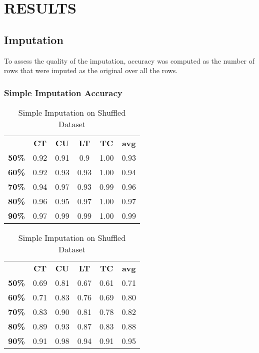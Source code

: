\documentclass{article}
\begin{document}
\section{RESULTS}

\subsection{Imputation}
To assess the quality of the imputation, accuracy was computed as the number of rows that were imputed as the original over all the rows.

\subsubsection{Simple Imputation Accuracy}

\begin{table}[h]
\begin{minipage}{.45\textwidth}\centering
\begin{tabular}{cccccc}
			  & \textbf{CT} & \textbf{CU} & \textbf{LT} & \textbf{TC} & \textbf{avg} \\
\textbf{50\%} & 0.92        & 0.91        & 0.9         & 1.00        & 0.93 \\
\textbf{60\%} & 0.92        & 0.93        & 0.93        & 1.00        & 0.94 \\
\textbf{70\%} & 0.94        & 0.97        & 0.93        & 0.99        & 0.96 \\
\textbf{80\%} & 0.96        & 0.95        & 0.97        & 1.00        & 0.97 \\
\textbf{90\%} & 0.97        & 0.99        & 0.99        & 1.00        & 0.99
\end{tabular}
\caption{Simple Imputation}
\end{minipage}
\hfill
\begin{minipage}{.5\textwidth}\centering
\begin{tabular}{cccccc}
			  & \textbf{CT} & \textbf{CU} & \textbf{LT} & \textbf{TC} & \textbf{avg} \\
\textbf{50\%} & 0.69        & 0.81        & 0.67        & 0.61        & 0.71 \\
\textbf{60\%} & 0.71        & 0.83        & 0.76        & 0.69        & 0.80 \\
\textbf{70\%} & 0.83        & 0.90        & 0.81        & 0.78        & 0.82 \\
\textbf{80\%} & 0.89        & 0.93        & 0.87        & 0.83        & 0.88 \\
\textbf{90\%} & 0.91        & 0.98        & 0.94        & 0.91        & 0.95
\end{tabular}
\caption{Simple Imputation on Shuffled Dataset}
\end{minipage}
\end{table}
\end{document}
